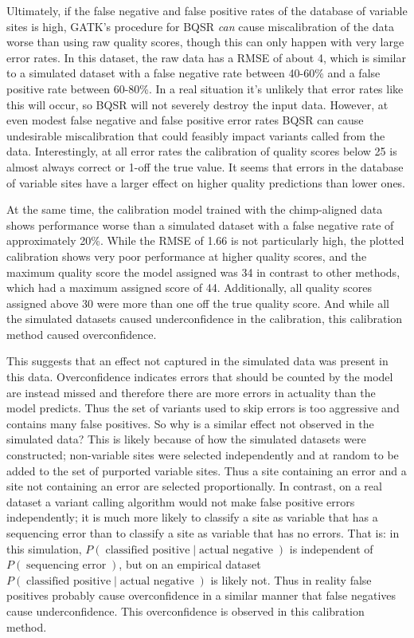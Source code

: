 Ultimately, if the false negative and false positive rates of the database of variable sites is high, GATK's procedure for BQSR \textit{can} cause miscalibration of the data worse than using raw quality scores, though this can only happen with very large error rates. In this dataset, the raw data has a RMSE of about 4, which is similar to a simulated dataset with a false negative rate between 40-60\% and a false positive rate between 60-80\%. In a real situation it's unlikely that error rates like this will occur, so BQSR will not severely destroy the input data. However, at even modest false negative and false positive error rates BQSR can cause undesirable miscalibration that could feasibly impact variants called from the data. Interestingly, at all error rates the calibration of quality scores below 25 is almost always correct or 1-off the true value. It seems that errors in the database of variable sites have a larger effect on higher quality predictions than lower ones.

At the same time, the calibration model trained with the chimp-aligned data shows performance worse than a simulated dataset with a false negative rate of approximately 20\%. While the RMSE of 1.66 is not particularly high, the plotted calibration shows very poor performance at higher quality scores, and the maximum quality score the model assigned was 34 in contrast to other methods, which had a maximum assigned score of 44. Additionally, all quality scores assigned above 30 were more than one off the true quality score. And while all the simulated datasets caused underconfidence in the calibration, this calibration method caused overconfidence.

This suggests that an effect not captured in the simulated data was present in this data. Overconfidence indicates errors that should be counted by the model are instead missed and therefore there are more errors in actuality than the model predicts. Thus the set of variants used to skip errors is too aggressive and contains many false positives. So why is a similar effect not observed in the simulated data? This is likely because of how the simulated datasets were constructed; non-variable sites were selected independently and at random to be added to the set of purported variable sites. Thus a site containing an error and a site not containing an error are selected proportionally. In contrast, on a real dataset a variant calling algorithm would not make false positive errors independently; it is much more likely to classify a site as variable that has a sequencing error than to classify a site as variable that has no errors. That is: in this simulation, $P(\operatorname{classified\:positive} | \operatorname{actual\:negative})$ is independent of $P(\operatorname{sequencing\:error})$, but on an empirical dataset $P(\operatorname{classified\:positive} | \operatorname{actual\:negative})$ is likely not. Thus in reality false positives probably cause overconfidence in a similar manner that false negatives cause underconfidence. This overconfidence is observed in this calibration method.

